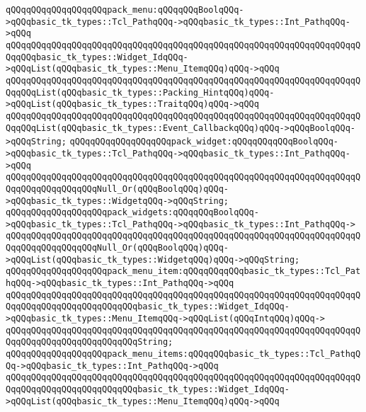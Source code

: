 \newline
\verb|qQQqqQQqqQQqqQQqqQQqpack_menu:qQQqqQQqBoolqQQq->qQQqbasic_tk_types::Tcl_PathqQQq->qQQqbasic_tk_types::Int_PathqQQq->qQQq|\newline
\verb|qQQqqQQqqQQqqQQqqQQqqQQqqQQqqQQqqQQqqQQqqQQqqQQqqQQqqQQqqQQqqQQqqQQqqQQqqQQqbasic_tk_types::Widget_IdqQQq->qQQqList(qQQqbasic_tk_types::Menu_ItemqQQq)qQQq->qQQq|\newline
\verb|qQQqqQQqqQQqqQQqqQQqqQQqqQQqqQQqqQQqqQQqqQQqqQQqqQQqqQQqqQQqqQQqqQQqqQQqqQQqList(qQQqbasic_tk_types::Packing_HintqQQq)qQQq->qQQqList(qQQqbasic_tk_types::TraitqQQq)qQQq->qQQq|\newline
\verb|qQQqqQQqqQQqqQQqqQQqqQQqqQQqqQQqqQQqqQQqqQQqqQQqqQQqqQQqqQQqqQQqqQQqqQQqqQQqList(qQQqbasic_tk_types::Event_CallbackqQQq)qQQq->qQQqBoolqQQq->qQQqString;|\newline
\newline
\verb|qQQqqQQqqQQqqQQqqQQqpack_widget:qQQqqQQqqQQqBoolqQQq->qQQqbasic_tk_types::Tcl_PathqQQq->qQQqbasic_tk_types::Int_PathqQQq->qQQq|\newline
\verb|qQQqqQQqqQQqqQQqqQQqqQQqqQQqqQQqqQQqqQQqqQQqqQQqqQQqqQQqqQQqqQQqqQQqqQQqqQQqqQQqqQQqqQQqNull_Or(qQQqBoolqQQq)qQQq->qQQqbasic_tk_types::WidgetqQQq->qQQqString;|\newline
\verb|qQQqqQQqqQQqqQQqqQQqpack_widgets:qQQqqQQqBoolqQQq->qQQqbasic_tk_types::Tcl_PathqQQq->qQQqbasic_tk_types::Int_PathqQQq->|\newline
\verb|qQQqqQQqqQQqqQQqqQQqqQQqqQQqqQQqqQQqqQQqqQQqqQQqqQQqqQQqqQQqqQQqqQQqqQQqqQQqqQQqqQQqqQQqNull_Or(qQQqBoolqQQq)qQQq->qQQqList(qQQqbasic_tk_types::WidgetqQQq)qQQq->qQQqString;|\newline
\newline
\verb|qQQqqQQqqQQqqQQqqQQqpack_menu_item:qQQqqQQqqQQqbasic_tk_types::Tcl_PathqQQq->qQQqbasic_tk_types::Int_PathqQQq->qQQq|\newline
\verb|qQQqqQQqqQQqqQQqqQQqqQQqqQQqqQQqqQQqqQQqqQQqqQQqqQQqqQQqqQQqqQQqqQQqqQQqqQQqqQQqqQQqqQQqqQQqqQQqbasic_tk_types::Widget_IdqQQq->qQQqbasic_tk_types::Menu_ItemqQQq->qQQqList(qQQqIntqQQq)qQQq->|\newline
\verb|qQQqqQQqqQQqqQQqqQQqqQQqqQQqqQQqqQQqqQQqqQQqqQQqqQQqqQQqqQQqqQQqqQQqqQQqqQQqqQQqqQQqqQQqqQQqqQQqString;|\newline
\verb|qQQqqQQqqQQqqQQqqQQqpack_menu_items:qQQqqQQqbasic_tk_types::Tcl_PathqQQq->qQQqbasic_tk_types::Int_PathqQQq->qQQq|\newline
\verb|qQQqqQQqqQQqqQQqqQQqqQQqqQQqqQQqqQQqqQQqqQQqqQQqqQQqqQQqqQQqqQQqqQQqqQQqqQQqqQQqqQQqqQQqqQQqqQQqbasic_tk_types::Widget_IdqQQq->qQQqList(qQQqbasic_tk_types::Menu_ItemqQQq)qQQq->qQQq|\newline
